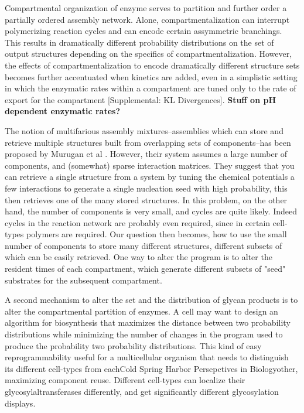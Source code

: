 \documentclass[twocolumn]{article}
\begin{document}
Compartmental organization of enzyme serves to partition and further order a partially ordered assembly network. Alone, compartmentalization can interrupt polymerizing reaction cycles and can encode certain assymmetric branchings. This results in dramatically different probability distributions on the set of output structures depending on the specifics of compartmentalization. However, the effects of compartmentalization to encode dramatically different structure sets becomes further accentuated when kinetics are added, even in a simplistic setting in which the enzymatic rates within a compartment are tuned only to the rate of export for the compartment [Supplemental: KL Divergences]. \textbf{Stuff on pH dependent enzymatic rates?}

The notion of multifarious assembly mixtures--assemblies which can store and retrieve multiple structures built from overlapping sets of components--has been proposed by Murugan et al \cite{Brenner2015}. However, their system assumes a large number of components, and (somewhat) sparse interaction matrices. They suggest that you can retrieve a single structure from a system by tuning the chemical potentials a few interactions to generate a single nucleation seed with high probability, this then retrieves one of the many stored structures. In this problem, on the other hand, the number of components is very small, and cycles are quite likely. Indeed cycles in the reaction network are probably even required, since in certain cell-types polymers are required. Our question then becomes, how to use the small number of components to store many different structures, different subsets of which can be easily retrieved. One way to alter the program is to alter the resident times of each compartment, which generate different subsets of "seed" substrates for the subsequent compartment. 

A second mechanism to alter the set and the distribution of glycan products is to alter the compartmental partition of enzymes. A cell may want to design an algorithm for biosynthesis that maximizes the distance between two probability distributions while minimizing the number of changes in the program used to produce the probability two probability distributions. This kind of easy reprogrammability useful for a multicellular organism that needs to distinguish its different cell-types from eachCold Spring Harbor Persepctives in Biologyother, maximizing component reuse. Different cell-types can localize their glycosylaltransferases differently, and get significantly different glycosylation displays. 
\end{document}
